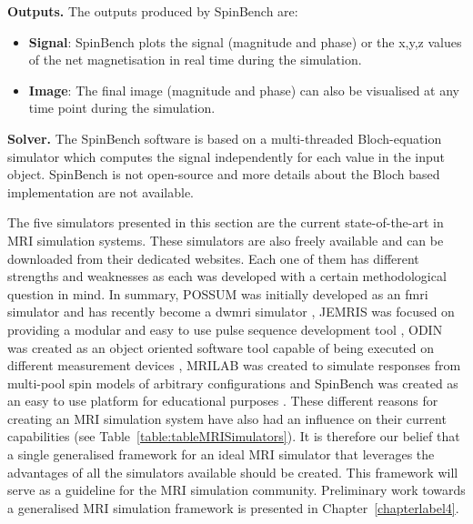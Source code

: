 \hfill

\textbf{Outputs.} The outputs produced by SpinBench are:
\begin{itemize}
    
    \item \textbf{Signal}: SpinBench plots the signal (magnitude and phase) or the x,y,z values of the net magnetisation in real time during the simulation.
    
    \item \textbf{Image}: The final image (magnitude and phase) can also be visualised at any time point during the simulation.
    
\end{itemize}

\hfill

\textbf{Solver.} The SpinBench software is based on a multi-threaded Bloch-equation simulator which computes the signal independently for each value in the input object.
SpinBench is not open-source and more details about the Bloch based implementation are not available.

\hfill

The five simulators presented in this section are the current state-of-the-art in MRI simulation systems.
These simulators are also freely available and can be downloaded from their dedicated websites.
Each one of them has different strengths and weaknesses as each was developed with a certain methodological question in mind.
In summary, 
POSSUM was initially developed as an \ac{fmri} simulator \cite{Drobnjak2006} and has recently become a \ac{dwmri} simulator \cite{Graham2016}, 
JEMRIS was focused on providing a modular and easy to use pulse sequence development tool \cite{Stocker2010}, 
ODIN was created as an object oriented software tool capable of being executed on different measurement devices \cite{Jochimsen2004},
MRILAB was created to simulate responses from multi-pool spin models of arbitrary configurations \cite{Liu2017}
and
SpinBench was created as an easy to use platform for educational purposes \cite{Overall2007}.
These different reasons for creating an MRI simulation system have also had an influence on their current capabilities (see Table~\ref{table:tableMRISimulators}).
It is therefore our belief that a single generalised framework for an ideal MRI simulator that leverages the advantages of all the simulators available should be created.
This framework will serve as a guideline for the MRI simulation community.
Preliminary work towards a generalised MRI simulation framework is presented in Chapter~\ref{chapterlabel4}.


